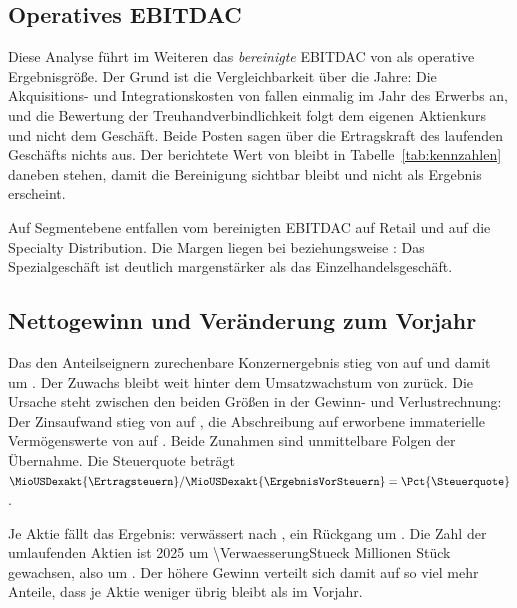 \subsection{Operatives EBITDAC}

Diese Analyse f\"uhrt im Weiteren das \emph{bereinigte} EBITDAC von
\MioUSDexakt{\EBITDACber} als operative Ergebnisgr\"o{\ss}e. Der Grund ist
die Vergleichbarkeit \"uber die Jahre: Die Akquisitions- und
Integrationskosten von \MioUSDexakt{\AkqIntegrationskosten} fallen einmalig
im Jahr des Erwerbs an, und die Bewertung der Treuhandverbindlichkeit folgt
dem eigenen Aktienkurs und nicht dem Gesch\"aft.
Beide Posten sagen \"uber die Ertragskraft des laufenden Gesch\"afts nichts
aus. Der berichtete Wert von \MioUSDexakt{\EBITDAC} bleibt in
Tabelle~\ref{tab:kennzahlen} daneben stehen, damit die Bereinigung
sichtbar bleibt und nicht als Ergebnis erscheint.

Auf Segmentebene entfallen vom bereinigten EBITDAC
\MioUSDexakt{\RetailEBITDACber} auf Retail und
\MioUSDexakt{\SpezEBITDACber} auf die Specialty Distribution. Die Margen
liegen bei 
beziehungsweise
: Das
Spezialgesch\"aft ist deutlich margenst\"arker als das
Einzelhandelsgesch\"aft.

\subsection{Nettogewinn und Ver\"anderung zum Vorjahr}

Das den Anteilseignern zurechenbare Konzernergebnis stieg von
\MioUSDexakt{\KonzernergebnisVJ} auf \MioUSDexakt{\Konzernergebnis} und
damit um \Pct{\ErgebnisDelta}. Der Zuwachs bleibt weit
hinter dem Umsatzwachstum von \Pct{\UmsatzDelta} zur\"uck. Die Ursache
steht zwischen den beiden Gr\"o{\ss}en in der Gewinn- und Verlustrechnung:
Der Zinsaufwand stieg von \MioUSDexakt{\ZinsaufwandVJ} auf
\MioUSDexakt{\Zinsaufwand}, die Abschreibung auf erworbene immaterielle
Verm\"ogenswerte von \MioUSDexakt{\AbschrImmatVJ} auf
\MioUSDexakt{\AbschrImmat}. Beide Zunahmen sind
unmittelbare Folgen der \"Ubernahme. Die Steuerquote betr\"agt
$\MioUSDexakt{\Ertragsteuern} / \MioUSDexakt{\ErgebnisVorSteuern} =
\Pct{\Steuerquote}$.

Je Aktie f\"allt das Ergebnis: verw\"assert \USDje{\EPSdil} nach
\USDje{\EPSdilVJ}, ein R\"uckgang um \PctBetrag{\EPSdilDelta}. Die Zahl der
umlaufenden Aktien ist 2025 um \num{\VerwaesserungStueck} Millionen St\"uck
gewachsen, also um \Pct{\AktienZuwachs}. Der h\"ohere
Gewinn verteilt sich damit auf so viel mehr Anteile, dass je Aktie weniger
\"ubrig bleibt als im Vorjahr.

